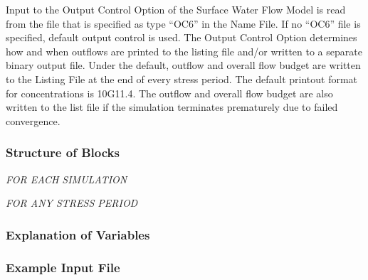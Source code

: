 Input to the Output Control Option of the Surface Water Flow Model is read from the file that is specified as type ``OC6'' in the Name File. If no ``OC6'' file is specified, default output control is used. The Output Control Option determines how and when outflows are printed to the listing file and/or written to a separate binary output file.  Under the default, outflow and overall flow budget are written to the Listing File at the end of every stress period. The default printout format for concentrations is 10G11.4.  The outflow and overall flow budget are also written to the list file if the simulation terminates prematurely due to failed convergence.

\vspace{5mm}
\subsubsection{Structure of Blocks}
\vspace{5mm}

\noindent \textit{FOR EACH SIMULATION}

\vspace{5mm}
\noindent \textit{FOR ANY STRESS PERIOD}


\vspace{5mm}
\subsubsection{Explanation of Variables}
\begin{description}

\end{description}

\vspace{5mm}
\subsubsection{Example Input File}

